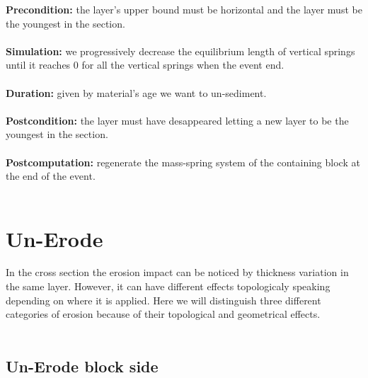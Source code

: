 \documentclass[12pt, a4paper]{report} %
\begin{document}
\textbf{Precondition:} the layer's upper bound must be horizontal and the layer must be the youngest in the section.\\\\
\textbf{Simulation:} we progressively decrease the equilibrium length of vertical springs until it reaches $0$ for all the vertical springs when the event end.\\\\
\textbf{Duration:} given by material's age we want to un-sediment.\\\\
\textbf{Postcondition:} the layer must have desappeared letting a new layer to be the youngest 
in the section.\\\\
\textbf{Postcomputation:} regenerate the mass-spring system of the containing block at the end of the event.\\\\

\section{Un-Erode}

In the cross section the erosion impact can be noticed by thickness variation in the same layer. However, it can have different effects topologicaly speaking depending on where it is applied. Here we will distinguish three different categories of erosion because of their topological and geometrical effects.\\\\

\subsection{Un-Erode block side}
\end{document}

